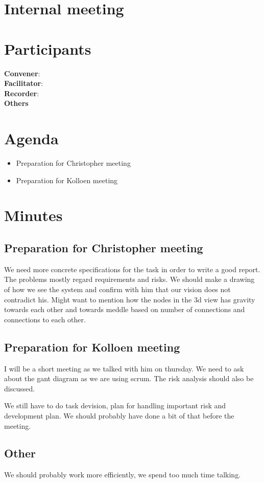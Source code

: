 \section*{Internal meeting}

\section*{Participants}

\textbf{Convener}: \groupleader{}     \\
\textbf{Facilitator}: \facilitator{}  \\ 
\textbf{Recorder}: \scrummaster{}   \\ 
\textbf{Others}                    \\

\section*{Agenda}
\begin{itemize}
    \item Preparation for Christopher meeting
    \item Preparation for Kolloen meeting
\end{itemize}

\section*{Minutes}

\subsection*{Preparation for Christopher meeting}

We need more concrete specifications for the task in order to write a good report. The problems mostly regard requirements and risks. We should make a drawing of how we see the system and confirm with him that our vision does not contradict his. Might want to mention how the nodes in the 3d view has gravity towards each other and towards meddle based on number of connections and connections to each other.

\subsection*{Preparation for Kolloen meeting}

I will be a short meeting as we talked with him on thursday.
We need to ask about the gant diagram as we are using scrum. The risk analysis should also be discussed.  

We still have to do task devision, plan for handling important risk and development plan. We should probably have done a bit of that before the meeting.

\subsection*{Other}

We should probably work more efficiently, we spend too much time talking.

\newpage